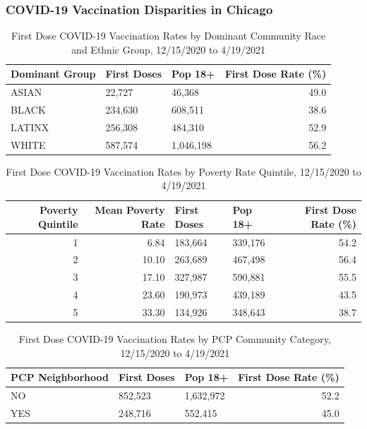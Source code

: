 \documentclass[
]{article}
\begin{document}
\hypertarget{covid-19-vaccination-disparities-in-chicago}{%
\subsubsection{COVID-19 Vaccination Disparities in Chicago}\label{covid-19-vaccination-disparities-in-chicago}}

\begin{table}

\caption{\label{tab:vaccinations-by-race}First Dose COVID-19 Vaccination Rates by Dominant Community Race and Ethnic Group, 12/15/2020 to 4/19/2021}
\centering
\begin{tabular}[t]{lllr}
\toprule
Dominant Group & First Doses & Pop 18+ & First Dose Rate (\%)\\
\midrule
ASIAN & 22,727 & 46,368 & 49.0\\
BLACK & 234,630 & 608,511 & 38.6\\
LATINX & 256,308 & 484,310 & 52.9\\
WHITE & 587,574 & 1,046,198 & 56.2\\
\bottomrule
\end{tabular}
\end{table}

\begin{table}

\caption{\label{tab:vaccinations-by-poverty}First Dose COVID-19 Vaccination Rates by Poverty Rate Quintile, 12/15/2020 to 4/19/2021}
\centering
\begin{tabular}[t]{rrllr}
\toprule
Poverty Quintile & Mean Poverty Rate & First Doses & Pop 18+ & First Dose Rate (\%)\\
\midrule
1 & 6.84 & 183,664 & 339,176 & 54.2\\
2 & 10.10 & 263,689 & 467,498 & 56.4\\
3 & 17.10 & 327,987 & 590,881 & 55.5\\
4 & 23.60 & 190,973 & 439,189 & 43.5\\
5 & 33.30 & 134,926 & 348,643 & 38.7\\
\bottomrule
\end{tabular}
\end{table}

\begin{table}

\caption{\label{tab:vaccinations-by-pcp}First Dose COVID-19 Vaccination Rates by PCP Community Category, 12/15/2020 to 4/19/2021}
\centering
\begin{tabular}[t]{lllr}
\toprule
PCP Neighborhood & First Doses & Pop 18+ & First Dose Rate (\%)\\
\midrule
NO & 852,523 & 1,632,972 & 52.2\\
YES & 248,716 & 552,415 & 45.0\\
\bottomrule
\end{tabular}
\end{table}
\end{document}
